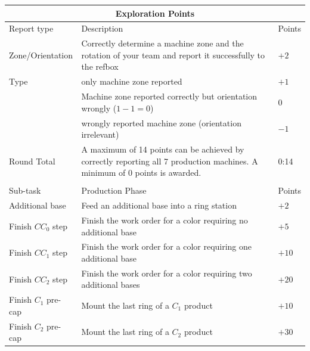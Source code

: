 \documentclass[12pt,twoside]{article}
\newcommand{\SItextrange}[3][]{
  \SI[
  input-quotient=:,
  output-quotient=\text{ to },
  quotient-mode=symbol,
  #1
  ]
  {#2}{#3}
}
\begin{document}
\begin{longtable}{p{}
    |p{}
    |p{}}

          \multicolumn{3}{c}{\textbf{Exploration Points}}\\\hline
           \multicolumn{1}{l}{Report type}
           & \multicolumn{1}{l}{Description}
           & \multicolumn{1}{l}{Points}\\\hline\hline
          Zone/Orientation
          & Correctly determine a machine zone and the rotation of your team
            and report it successfully to the \ac{refbox}
          & $+2$
          \\
          Type
          & only machine zone reported
          & $+1$
          \\
          & Machine zone reported correctly but orientation wrongly ($1-1=0$)
          & $0$
          \\
		      & wrongly reported machine zone (orientation irrelevant)
          & $-1$
          \\
          \hline
          Round Total
          & A maximum of 14 points can be achieved by correctly reporting all
            7 production machines. A minimum of 0 points is awarded.
          & \SItextrange{0:14}{}\\
          \hhline{===}
          \multicolumn{3}{c}{\textbf{Production Points}}\\\hline
        \multicolumn{1}{l}{Sub-task }
        & \multicolumn{1}{l}{Production Phase}
        & \multicolumn{1}{l}{Points}
        \\
        \hline\hline
        Additional base & Feed an additional base into a ring station & $+2$
        \\
        Finish $CC_0$ step
        & Finish the work order for a color requiring no additional base
        & $+5$
        \\
        Finish $CC_1$ step
        & Finish the work order for a color requiring one additional base
        & $+10$
        \\
        Finish $CC_2$ step
        & Finish the work order for a color requiring two additional bases
        & $+20$
        \\
        Finish $C_1$ pre-cap & Mount the last ring of a $C_1$ product & $+10$
        \\
        Finish $C_2$ pre-cap & Mount the last ring of a $C_2$ product & $+30$

\end{longtable}
\end{document}
